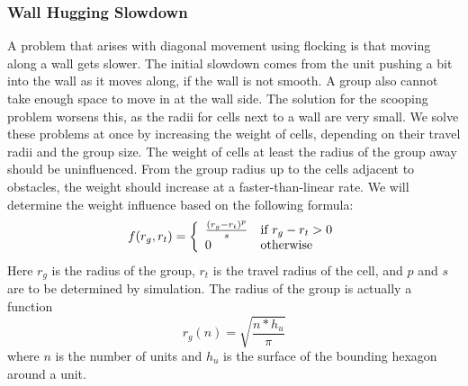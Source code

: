 \subsubsection{Wall Hugging Slowdown}
A problem that arises with diagonal movement using flocking is that moving along a wall gets slower. The initial slowdown comes from the unit pushing a bit into the wall as it moves along, if the wall is not smooth. A group also cannot take enough space to move in at the wall side. The solution for the scooping problem worsens this, as the radii for cells next to a wall are very small. We solve these problems at once by increasing the weight of cells, depending on their travel radii and the group size. The weight of cells at least the radius of the group away should be uninfluenced. From the group radius up to the cells adjacent to obstacles, the weight should increase at a faster-than-linear rate. We will determine the weight influence based on the following formula:
$$f(r_g, r_t) = \left\{\begin{array}{l l}
					\frac{(r_g - r_t)^p}{s} & \text{if } r_g - r_t > 0\\
					0 & \text{otherwise}
                \end{array}\right.
                $$
Here $r_g$ is the radius of the group, $r_t$ is the travel radius of the cell, and $p$ and $s$ are to be determined by simulation. The radius of the group is actually a function $$r_g(n) = \sqrt{\frac{n * h_u}{\pi}}$$ where $n$ is the number of units and $h_u$ is the surface of the bounding hexagon around a unit.